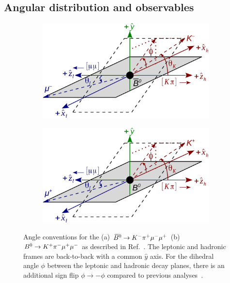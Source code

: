 \subsection{Angular distribution and observables}
\label{sec:kpimm:angular-distribution}

\begin{figure}
\centering
\begin{subfigure}{0.49\textwidth}
\includegraphics[width=\textwidth]{figs/kpimm/angular-distribution/angles_bzb.pdf}
\caption{}
\label{fig:angle_conventions:bzb}
\end{subfigure}
\begin{subfigure}{0.49\textwidth}
\centering
\includegraphics[width=\textwidth]{figs/kpimm/angular-distribution/angles_bz.pdf}
\caption{}
\label{fig:angle_conventions:bz}
\end{subfigure}
\caption{Angle conventions for the (a) ${{\kern 0.18em\overline{\kern -0.18em B}{}}{}^0} \rightarrow {\ensuremath{{K}^-}} {\ensuremath{{\pi}^+}} {\ensuremath{\mu^-}} {\ensuremath{\mu^+}}$ (b)  ${{B}^0} \rightarrow {\ensuremath{{K}^+}} {\ensuremath{{\pi}^-}} {\ensuremath{\mu^+}} {\ensuremath{\mu^-}}$ as described in Ref.~\cite{biplab}. The leptonic and hadronic frames are back-to-back with a common $\hat{y}$ axis. For the dihedral angle $\phi$ between the leptonic and hadronic decay planes, there is an additional sign flip $\phi\to -\phi$ compared to previous \lhcb analyses~\cite{LHCB-PAPER-2011-020,LHCB-PAPER-2013-019,LHCB-PAPER-2013-037,LHCB-PAPER-2015-051}.
}
\label{fig:angle_conventions}
\end{figure}

